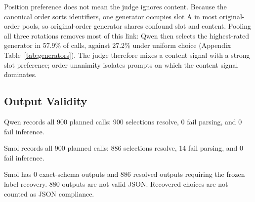 Position preference does not mean the judge ignores content. Because the canonical order sorts identifiers, one generator occupies slot A in most original-order pools, so original-order generator shares confound slot and content. Pooling all three rotations removes most of this link: Qwen then selects the highest-rated generator in 57.9\% of calls, against 27.2\% under uniform choice (Appendix Table~\ref{tab:generators}). The judge therefore mixes a content signal with a strong slot preference; order unanimity isolates prompts on which the content signal dominates.

\subsection{Output Validity}

Qwen records all 900 planned calls: 900 selections resolve, 0 fail parsing, and 0 fail inference.

Smol records all 900 planned calls: 886 selections resolve, 14 fail parsing, and 0 fail inference.

Smol has 0 exact-schema outputs and 886 resolved outputs requiring the frozen label recovery. 880 outputs are not valid JSON. Recovered choices are not counted as JSON compliance.
